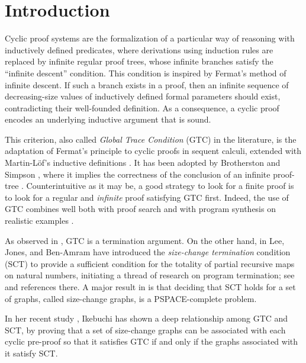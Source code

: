 \section{Introduction}
\label{sec:Introduction}



Cyclic proof systems are the formalization of a particular way of reasoning with inductively defined predicates, where derivations using induction rules are replaced by infinite regular proof trees, whose infinite branches satisfy the ``infinite descent'' condition. This condition is inspired by Fermat’s method of infinite descent. If such a branch exists in a proof, then an infinite sequence of decreasing-size values of inductively defined formal parameters should exist, contradicting their well-founded definition. As a consequence, a cyclic proof encodes an underlying inductive argument that is sound.

This criterion,
 also called {\em Global Trace Condition} (GTC) in the literature, is the adaptation of Fermat's 
principle to cyclic proofs in sequent calculi, extended with Martin-Löf's  inductive definitions \cite{MartinLof}. It has been adopted by Brotherston and Simpson
\cite{Brotherston1, Brotherston2,BrotherstonSimpson}, where it implies the correctness of the 
conclusion of an infinite proof-tree \cite[Proposition 4.2.10]{Brotherston1}.
Counterintuitive as it may be, a good strategy 
to look for a finite proof is to look for a regular and \emph{infinite} proof satisfying GTC first.
Indeed, the use of GTC combines well both with proof search and with program synthesis
on realistic examples \cite{10.1007/978-3-642-35182-2_25,10.1145/3632888, 10.1007/978-3-031-90643-5_18,  10.1145/3453483.3454087,  10.1145/3018610.3018623, Stratulat_2021, Brotherston2020}. 

As observed in \cite{Brotherston1}, GTC is a termination argument. 
On the other hand, in \cite{Lee1} Lee, Jones, and Ben-Amram have
introduced the \emph{size-change termination} condition (SCT) 
to provide a sufficient condition for the totality of partial recursive maps on natural numbers,
initiating a thread of research on program termination; see \cite{Lee2,Ben-AmramLee2007,Lee3} and references there.
A major result in \cite{Lee1} is that deciding that SCT holds for a set of graphs, called size-change graphs, is a PSPACE-complete problem.

In her recent study \cite{Mirai}, Ikebuchi has shown a deep relationship among GTC and SCT, by proving that a set of size-change graphs can be associated with each cyclic pre-proof so that it satisfies GTC if and only if the graphs associated with it satisfy SCT.

